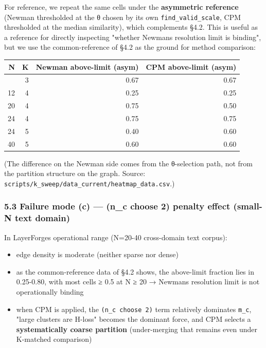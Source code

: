 \documentclass[
]{article}
\newcounter{none} %
\providecommand{\tightlist}{%
  \setlength{\itemsep}{0pt}\setlength{\parskip}{0pt}}
\begin{document}
For reference, we repeat the same cells under the \textbf{asymmetric
reference} (Newman thresholded at the θ chosen by its own
\texttt{find\_valid\_scale}, CPM thresholded at the median similarity),
which complements §4.2. This is useful as a reference for directly
inspecting "whether Newman\textquotesingle s resolution limit is
binding", but we use the common-reference of §4.2 as the ground for
method comparison:

{\def\LTcaptype{none} %
\begin{longtable}[]{@{}rrrr@{}}
\toprule\noalign{}
N & K & Newman above-limit (asym) & CPM above-limit (asym) \\
\midrule\noalign{}
\endhead
\bottomrule\noalign{}
\endlastfoot
12 & 3 & 0.67 & 0.67 \\
12 & 4 & 0.25 & 0.25 \\
20 & 4 & 0.75 & 0.50 \\
24 & 4 & 0.75 & 0.75 \\
24 & 5 & 0.40 & 0.60 \\
40 & 5 & 0.60 & 0.60 \\
\end{longtable}
}

(The difference on the Newman side comes from the θ-selection path, not
from the partition structure on the graph. Source:
\texttt{scripts/k\_sweep/data\_current/heatmap\_data.csv}.)

\subsubsection{5.3 Failure mode (c) --- (n\_c choose 2) penalty effect
(small-N text
domain)}\label{53-failure-mode-c--n_c-choose-2-penalty-effect-small-n-text-domain}

In LayerForge\textquotesingle s operational range (N=20-40 cross-domain
text corpus):

\begin{itemize}
\tightlist
\item
  edge density is moderate (neither sparse nor dense)
\item
  as the common-reference data of §4.2 shows, the above-limit fraction
  lies in 0.25-0.80, with most cells ≥ 0.5 at N ≥ 20 →
  Newman\textquotesingle s resolution limit is not operationally binding
\item
  when CPM is applied, the \texttt{(n\_c\ choose\ 2)} term relatively
  dominates \texttt{m\_c}, "large clusters are H-loss" becomes the
  dominant force, and CPM selects a \textbf{systematically coarse
  partition} (under-merging that remains even under K-matched
  comparison)
\end{itemize}
\end{document}
